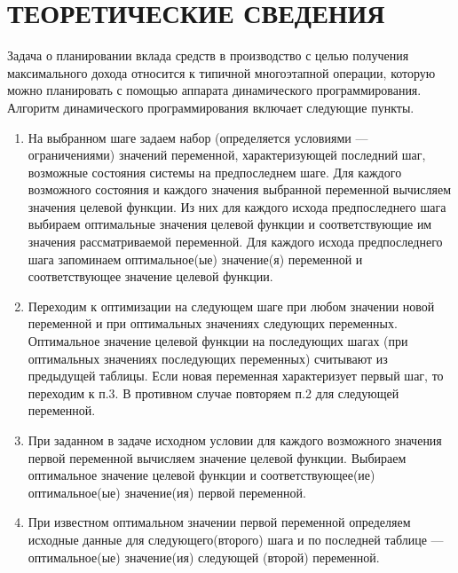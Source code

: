 
\section{ТЕОРЕТИЧЕСКИЕ СВЕДЕНИЯ}

Задача о планировании вклада средств в производство с целью получения максимального дохода относится к типичной многоэтапной операции, которую можно планировать с помощью аппарата динамического программирования. Алгоритм динамического программирования включает следующие пункты.

\begin{enumerate}
	\item На выбранном шаге задаем набор (определяется условиями --- ограничениями) значений переменной, характеризующей последний шаг, возможные состояния системы на предпоследнем шаге. Для каждого возможного состояния и каждого значения выбранной переменной вычисляем значения целевой функции. Из них для каждого исхода предпоследнего шага выбираем оптимальные значения целевой функции и соответствующие им значения рассматриваемой переменной. Для каждого исхода предпоследнего шага запоминаем оптимальное(ые) значение(я) переменной и соответствующее значение целевой функции.
	\item Переходим к оптимизации на следующем шаге при любом значении новой переменной и при оптимальных значениях следующих переменных. Оптимальное значение целевой функции на последующих шагах (при оптимальных значениях последующих переменных) считывают из предыдущей таблицы. Если новая переменная характеризует первый шаг, то переходим к п.3. В противном случае повторяем п.2 для следующей переменной.
	\item При заданном в задаче исходном условии для каждого возможного значения первой переменной вычисляем значение целевой функции. Выбираем оптимальное значение целевой функции и соответствующее(ие) оптимальное(ые) значение(ия) первой переменной.
	\item При известном оптимальном значении первой переменной определяем исходные данные для следующего(второго) шага и по последней таблице --- оптимальное(ые) значение(ия) следующей (второй) переменной.
\end{enumerate}

\newpage